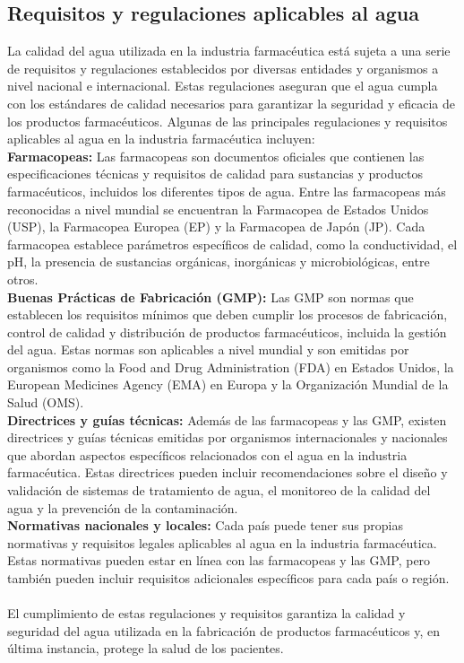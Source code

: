 \subsection{ Requisitos y regulaciones aplicables al agua}

La calidad del agua utilizada en la industria farmacéutica está sujeta a una serie de requisitos y regulaciones establecidos por diversas entidades y organismos a nivel nacional e internacional. Estas regulaciones aseguran que el agua cumpla con los estándares de calidad necesarios para garantizar la seguridad y eficacia de los productos farmacéuticos. Algunas de las principales regulaciones y requisitos aplicables al agua en la industria farmacéutica incluyen:\\

\textbf{Farmacopeas:} Las farmacopeas son documentos oficiales que contienen las especificaciones técnicas y requisitos de calidad para sustancias y productos farmacéuticos, incluidos los diferentes tipos de agua. Entre las farmacopeas más reconocidas a nivel mundial se encuentran la Farmacopea de Estados Unidos (USP), la Farmacopea Europea (EP) y la Farmacopea de Japón (JP). Cada farmacopea establece parámetros específicos de calidad, como la conductividad, el pH, la presencia de sustancias orgánicas, inorgánicas y microbiológicas, entre otros. \\

\textbf{ Buenas Prácticas de Fabricación (GMP):} Las GMP son normas que establecen los requisitos mínimos que deben cumplir
los procesos de fabricación, control de calidad y distribución de productos farmacéuticos, incluida la gestión del agua.
Estas normas son aplicables a nivel mundial y son emitidas por organismos como la Food and Drug Administration (FDA) en Estados Unidos, la European Medicines Agency (EMA) en Europa y la Organización Mundial de la Salud (OMS).\\

\textbf{ Directrices y guías técnicas:} Además de las farmacopeas y las GMP, existen directrices y guías técnicas emitidas por organismos internacionales y nacionales que abordan aspectos específicos relacionados con el agua en la industria farmacéutica. Estas directrices pueden incluir recomendaciones sobre el diseño y validación de sistemas de tratamiento de agua, el monitoreo de la calidad del agua y la prevención de la contaminación.\\

\textbf{ Normativas nacionales y locales:} Cada país puede tener sus propias normativas y requisitos legales aplicables al agua en la industria farmacéutica. Estas normativas pueden estar en línea con las farmacopeas y las GMP, pero también pueden incluir requisitos adicionales específicos para cada país o región.\\\\


El cumplimiento de estas regulaciones y requisitos garantiza la calidad y seguridad del agua utilizada en la fabricación de productos farmacéuticos y, en última instancia, protege la salud de los pacientes.
